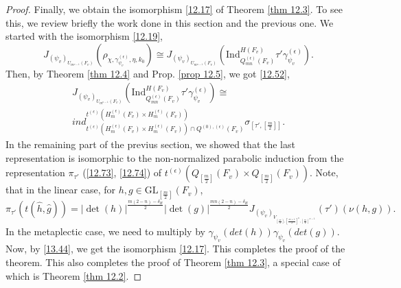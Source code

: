 \documentclass[12pts]{amsart}
\newcommand{\GL}{{\mathrm{GL}}}
\newcommand{\Ind}{{\mathrm{Ind}}}
\begin{document}
\begin{proof}
Finally, we obtain the isomorphism \eqref{12.17} of Theorem \ref{thm 12.3}. To see this, we review briefly the work done in this section and the previous one. We started with the isomorphism \eqref{12.19},
$$
J_{(\psi_v)_{U_{m^{n-1}}(F_v)}}(\rho_{\chi,\gamma_{\psi_v}^{(\epsilon)},\eta,k_0})\cong J_{(\psi_v)_{U_{m^{n-1}}(F_v)}}(\Ind^{H(F_v)}_{Q^{(\epsilon)}_{mn}(F_v)}\tau'\gamma_{\psi_v}^{(\epsilon)}).
$$
Then, by Theorem \ref{thm 12.4} and Prop. \ref{prop 12.5}, we got \eqref{12.52},
\begin{multline}\nonumber
J_{(\psi_v)_{U_{m^{n-1}}(F_v)}}(\Ind^{H(F_v)}_{Q^{(\epsilon)}_{mn}(F_v)}\tau'\gamma_{\psi_v}^{(\epsilon)})\cong\\ ind^{t^{(\epsilon)}(H^{(\epsilon)}_m(F_v)\times H^{(\epsilon)}_m(F_v))}_{t^{(\epsilon)}(H^{(\epsilon)}_m(F_v)\times H^{(\epsilon)}_m(F_v))\cap Q^{(0),(\epsilon)}(F_v)}\sigma_{[\tau',[\frac{m}{2}]]}.
\end{multline}
In the remaining part of the previus section, we showed that the last representation is isomorphic to the non-normalized parabolic induction from the representation $\pi_{\tau'}$ (\eqref{12.73}, \eqref{12.74}) of
$t^{(\epsilon)}(Q_{[\frac{m}{2}]}(F_v)\times Q_{[\frac{m}{2}]}(F_v))$. Note, that in the linear case, for $h,g\in \GL_{[\frac{m}{2}]}(F_v)$,
$$
\pi_{\tau'}(t(\hat{h},\hat{g}))=|\det(h)|^{\frac{m(2-n)-\delta_H}{2}}|\det(g)|^{\frac{mn(2-n)-\delta_H}{2}}J_{(\psi_v)_{V_{[\frac{m}{2}],[\frac{m+1}{2}]^n,[\frac{m}{2}]^{n-1}}}}(\tau')(\nu(h,g)).
$$
In the metaplectic case, we need to multiply by $\gamma_{\psi_v}(det(h))\gamma_{\psi_v}(det(g))$. Now, by \eqref{13.44}, we get the isomorphism \eqref{12.17}. This completes the proof of the theorem. This also completes the proof of Theorem \ref{thm 12.3}, a special case of which is Theorem \ref{thm 12.2}.

\end{proof}
\end{document}
